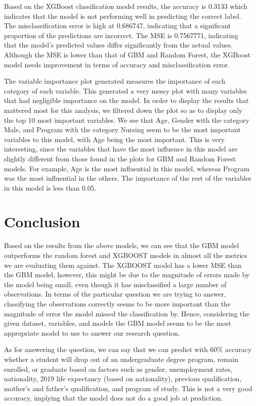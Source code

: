 \documentclass[
]{article}
\begin{document}
Based on the XGBoost classification model results, the accuracy is
0.3133 which indicates that the model is not performing well in
predicting the correct label. The misclassification error is high at
0.686747, indicating that a significant proportion of the predictions
are incorrect. The MSE is 0.7567771, indicating that the model's
predicted values differ significantly from the actual values. Although
the MSE is lower than that of GBM and Random Forest, the XGBoost model
needs improvement in terms of accuracy and misclassification error.

The variable importance plot generated measures the importance of each
category of each variable. This generated a very messy plot with many
variables that had negligible importance on the model. In order to
display the results that mattered most for this analysis, we filtered
down the plot so as to display only the top 10 most important variables.
We see that Age, Gender with the category Male, and Program with the
category Nursing seem to be the most important variables to this model,
with Age being the most important. This is very interesting, since the
variables that have the most influence in this model are slightly
different from those found in the plots for GBM and Random Forest
models. For example, Age is the most influential in this model, whereas
Program was the most influential in the others. The importance of the
rest of the variables in this model is less than 0.05.

\hypertarget{conclusion}{%
\section{Conclusion}\label{conclusion}}

Based on the results from the above models, we can see that the GBM
model outperforms the random forest and XGBOOST models in almost all the
metrics we are evaluating them against. The XGBOOST model has a lower
MSE than the GBM model, however, this might be due to the magnitude of
errors made by the model being small, even though it has misclassified a
large number of observations. In terms of the particular question we are
trying to answer, classifying the observations correctly seems to be
more important than the magnitude of error the model missed the
classification by. Hence, considering the given dataset, variables, and
models the GBM model seems to be the most appropriate model to use to
answer our research question.

As for answering the question, we can say that we can predict with 60\%
accuracy whether a student will drop out of an undergraduate degree
program, remain enrolled, or graduate based on factors such as gender,
unemployment rates, nationality, 2019 life expectancy (based on
nationality), previous qualification, mother's and father's
qualification, and program of study. This is not a very good accuracy,
implying that the model does not do a good job at prediction.
\end{document}
